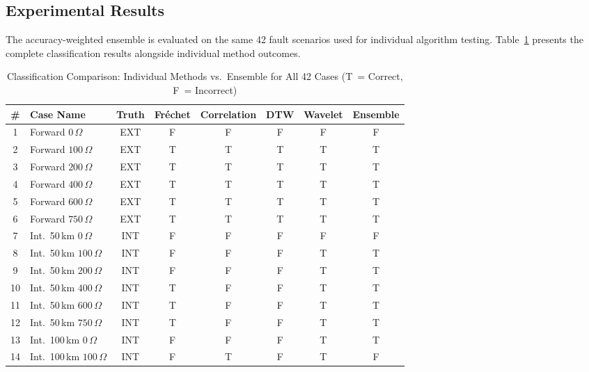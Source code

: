 \documentclass[journal]{IEEEtran}
\newcommand{\TT}{T}
\newcommand{\FF}{F}
\begin{document}
\subsection{Experimental Results}

The accuracy-weighted ensemble is evaluated on the same 42 fault
scenarios used for individual algorithm testing.
Table~\ref{tab:ensemble_results} presents the complete classification
results alongside individual method outcomes.

\begin{table}[!t]
\centering
\caption{Classification Comparison: Individual Methods vs.\ Ensemble
for All 42 Cases (\TT\ = Correct, \FF\ = Incorrect)}
\label{tab:ensemble_results}
\small
\setlength{\tabcolsep}{5pt}
\begin{tabular}{@{}clcccccc@{}}
\toprule
\textbf{\#} & \textbf{Case Name} & \textbf{Truth}
  & \textbf{Fr\'{e}chet} & \textbf{Correlation}
  & \textbf{DTW} & \textbf{Wavelet} & \textbf{Ensemble} \\
\midrule
 1 & Forward $0\,\Omega$     & EXT & \FF & \FF & \FF & \FF & \FF \\
 2 & Forward $100\,\Omega$   & EXT & \TT & \TT & \TT & \TT & \TT \\
 3 & Forward $200\,\Omega$   & EXT & \TT & \TT & \TT & \TT & \TT \\
 4 & Forward $400\,\Omega$   & EXT & \TT & \TT & \TT & \TT & \TT \\
 5 & Forward $600\,\Omega$   & EXT & \TT & \TT & \TT & \TT & \TT \\
 6 & Forward $750\,\Omega$   & EXT & \TT & \TT & \TT & \TT & \TT \\
\midrule
 7 & Int.\ 50\,km $0\,\Omega$    & INT & \FF & \FF & \FF & \FF & \FF \\
 8 & Int.\ 50\,km $100\,\Omega$  & INT & \FF & \FF & \FF & \TT & \TT \\
 9 & Int.\ 50\,km $200\,\Omega$  & INT & \FF & \FF & \FF & \TT & \TT \\
10 & Int.\ 50\,km $400\,\Omega$  & INT & \TT & \FF & \FF & \TT & \TT \\
11 & Int.\ 50\,km $600\,\Omega$  & INT & \TT & \FF & \FF & \TT & \TT \\
12 & Int.\ 50\,km $750\,\Omega$  & INT & \TT & \FF & \FF & \TT & \TT \\
\midrule
13 & Int.\ 100\,km $0\,\Omega$   & INT & \FF & \FF & \FF & \TT & \TT \\
14 & Int.\ 100\,km $100\,\Omega$ & INT & \FF & \TT & \FF & \TT & \FF \\

\end{tabular}
\end{table}
\end{document}
